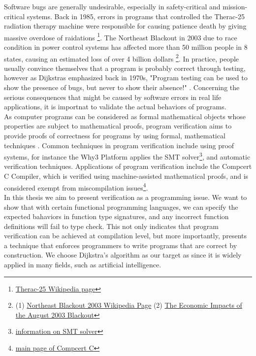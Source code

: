 Software bugs are generally undesirable, especially in safety-critical and mission-critical systems. Back in 1985, errors in programs that controlled the Therac-25 radiation therapy machine were responsible for causing patience death by giving massive overdose of raidations \footnote{\href{https://en.wikipedia.org/wiki/Therac-25}{Therac-25 Wikipedia page}}. The Northeast Blackout in 2003 due to race condition in power control systems has affected more than 50 million people in 8 states, causing an estimated loss of over 4 billion dollars \footnote{(1) \href{https://en.wikipedia.org/wiki/Northeast_blackout_of_2003}{Northeast Blackout 2003 Wikipedia Page} (2) \href{https://elcon.org/wp-content/uploads/Economic20Impacts20of20August20200320Blackout1.pdf}{The Economic Impacts of the August 2003 Blackout}}. In practice, people usually convince themselves that a program is probably correct through testing, however as Dijkstras emphasized back in 1970s, "Program testing can be used to show the presence of bugs, but never to show their absence!" \cite{DijkstrasQuote}. Concerning the serious consequences that might be caused by software errors in real life applications, it is importnat to validate the actual behaviors of programs. 
\\

As computer programs can be considered as formal mathematical objects whose properties are subject to mathematical proofs, program verification aims to provide proofs of correctness for programs by using formal, mathematical techniques \cite{Moore}. Common techniques in program verification include using proof systems, for instance the Why3 Platform \cite{why3} applies the SMT solver\footnote{\href{https://en.wikipedia.org/wiki/Satisfiability_modulo_theories}{information on SMT solver}}, and automatic verification techniques. Applications of program verification include the Compcert C Compiler, which is verified using machine-assisted mathematical proofs, and is considered exempt from miscompilation issues\footnote{\href{http://compcert.inria.fr/compcert-C.html}{main page of Compcert C}}. 
\\

In this thesis we aim to present verification as a programming issue. We want to show that with certain functional programming languages, we can specify the expected bahaviors in function type signatures, and any incorrect function definitions will fail to type check. This not only indicates that program verification can be achieved at compilation level, but more importantly, presents a technique that enforces programmers to write programs that are correct by construction. We choose Dijkstra's algorithm as our target as since it is widely applied in many fields, such as artificial intelligence. 
\\

